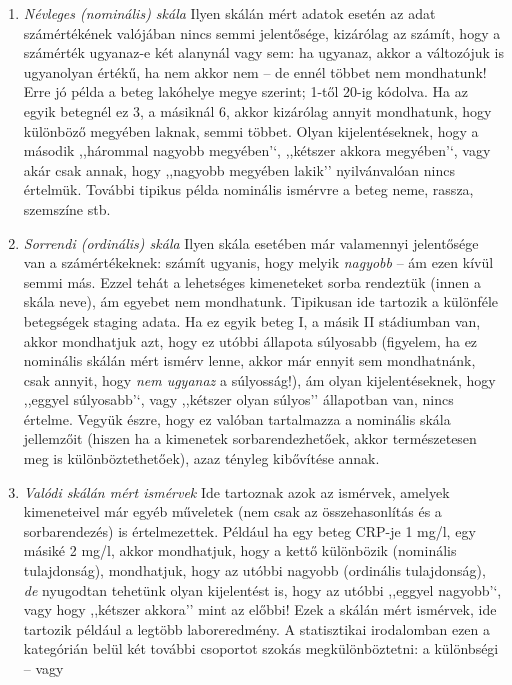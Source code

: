 \documentclass[]{book}
\providecommand{\tightlist}{%
  \setlength{\itemsep}{0pt}\setlength{\parskip}{0pt}}
\begin{document}
\begin{enumerate}
\def\labelenumi{\arabic{enumi}.}
\tightlist
\item
  \emph{Névleges (nominális) skála} Ilyen skálán mért adatok esetén az
  adat számértékének valójában nincs semmi jelentősége, kizárólag az
  számít, hogy a számérték ugyanaz-e két alanynál vagy sem: ha ugyanaz,
  akkor a változójuk is ugyanolyan értékű, ha nem akkor nem -- de ennél
  többet nem mondhatunk! Erre jó példa a beteg lakóhelye megye szerint;
  1-től 20-ig kódolva. Ha az egyik betegnél ez 3, a másiknál 6, akkor
  kizárólag annyit mondhatunk, hogy különböző megyében laknak, semmi
  többet. Olyan kijelentéseknek, hogy a második ,,hárommal nagyobb
  megyében'`, ,,kétszer akkora megyében'`, vagy akár csak annak, hogy
  ,,nagyobb megyében lakik'' nyilvánvalóan nincs értelmük. További
  tipikus példa nominális ismérvre a beteg neme, rassza, szemszíne stb.
\item
  \emph{Sorrendi (ordinális) skála} Ilyen skála esetében már valamennyi
  jelentősége van a számértékeknek: számít ugyanis, hogy melyik
  \emph{nagyobb} -- ám ezen kívül semmi más. Ezzel tehát a lehetséges
  kimeneteket sorba rendeztük (innen a skála neve), ám egyebet nem
  mondhatunk. Tipikusan ide tartozik a különféle betegségek staging
  adata. Ha ez egyik beteg I, a másik II stádiumban van, akkor
  mondhatjuk azt, hogy ez utóbbi állapota súlyosabb (figyelem, ha ez
  nominális skálán mért ismérv lenne, akkor már ennyit sem mondhatnánk,
  csak annyit, hogy \emph{nem ugyanaz} a súlyosság!), ám olyan
  kijelentéseknek, hogy ,,eggyel súlyosabb'`, vagy ,,kétszer olyan
  súlyos'' állapotban van, nincs értelme. Vegyük észre, hogy ez valóban
  tartalmazza a nominális skála jellemzőit (hiszen ha a kimenetek
  sorbarendezhetőek, akkor természetesen meg is különböztethetőek), azaz
  tényleg kibővítése annak.
\item
  \emph{Valódi skálán mért ismérvek} Ide tartoznak azok az ismérvek,
  amelyek kimeneteivel már egyéb műveletek (nem csak az összehasonlítás
  és a sorbarendezés) is értelmezettek. Például ha egy beteg CRP-je 1
  mg/l, egy másiké 2 mg/l, akkor mondhatjuk, hogy a kettő különbözik
  (nominális tulajdonság), mondhatjuk, hogy az utóbbi nagyobb (ordinális
  tulajdonság), \emph{de} nyugodtan tehetünk olyan kijelentést is, hogy
  az utóbbi ,,eggyel nagyobb'`, vagy hogy ,,kétszer akkora'' mint az
  előbbi! Ezek a skálán mért ismérvek, ide tartozik például a legtöbb
  laboreredmény. A statisztikai irodalomban ezen a kategórián belül két
  további csoportot szokás megkülönböztetni: a különbségi -- vagy

\end{enumerate}
\end{document}
